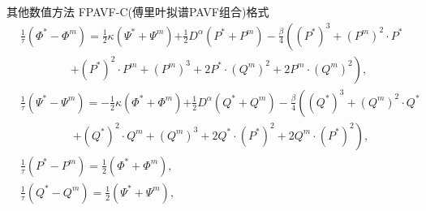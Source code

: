 \documentclass[aspectratio=169]{beamer}
\numberwithin{theorem}{section} %
\begin{document}
\begin{frame}{其他数值方法}
	FPAVF-C(傅里叶拟谱PAVF组合)格式
	\begin{align}
	&\frac{1}{\tau}\left(\varPhi^{*}-\varPhi^{m}\right)=\frac{1}{2}\kappa(\Psi^{*}+\Psi^{m}){+\frac{1}{2}D^{\alpha} (P^{*}+P^{m})}-\frac{\beta}{4}\left( (P^{*})^3+ (P^{m})^{2}\cdot P^{*}\right.\nonumber\\
			&~~~~~~~~~~~~~~~~~~~~\left.+ (P^{*})^{2}\cdot P^{m}+ (P^{m})^{3}+2 P^{*}\cdot (Q^{m})^{2}+2 P^{m}\cdot (Q^{m})^{2}\right),\label{eq_PAVF:90}\\
	&\frac{1}{\tau}\left(\Psi^{*}-\Psi^{m}\right)=-\frac{1}{2}\kappa (\varPhi^{*}+\varPhi^{m}){+\frac{1}{2}D^{\alpha} (Q^{*}+Q^{m})}-\frac{\beta}{4}\left( (Q^{*})^3+ (Q^{m})^{2}\cdot Q^{*}\right.\nonumber\\
			&~~~~~~~~~~~~~~~~~~~~~\left.+ (Q^{*})^{2}\cdot Q^{m}+ (Q^{m})^{3}+2 Q^{*}\cdot (P^{*})^{2}+2 Q^{m}\cdot (P^{*})^{2}\right),\label{eq_PAVF:91}\\
	&\frac{1}{\tau}\left(P^{*}-P^{m}\right)=\frac{1}{2}(\varPhi^{*}+\varPhi^{m}),\label{eq_PAVF:92}\\
	&\frac{1}{\tau}\left(Q^{*}-Q^{m}\right)=\frac{1}{2}(\Psi^{*}+\Psi^{m}),\label{eq_PAVF:93}\\
	\end{align}
\end{frame}
\end{document}
